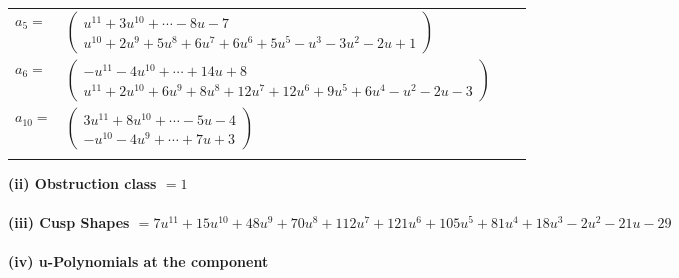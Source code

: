 \documentclass[1p]{elsarticle_modified}
\theoremstyle{definition}
\begin{document}
\begin{tabular}{m{7pt} m{180pt} m{7pt} m{180pt} }
\flushright $a_{5}=$&$\begin{pmatrix}u^{11}+3 u^{10}+\cdots-8 u-7\\u^{10}+2 u^9+5 u^8+6 u^7+6 u^6+5 u^5- u^3-3 u^2-2 u+1\end{pmatrix}$ \\
\flushright $a_{6}=$&$\begin{pmatrix}- u^{11}-4 u^{10}+\cdots+14 u+8\\u^{11}+2 u^{10}+6 u^9+8 u^8+12 u^7+12 u^6+9 u^5+6 u^4- u^2-2 u-3\end{pmatrix}$ \\
\flushright $a_{10}=$&$\begin{pmatrix}3 u^{11}+8 u^{10}+\cdots-5 u-4\\- u^{10}-4 u^9+\cdots+7 u+3\end{pmatrix}$\\&\end{tabular}
\flushleft \textbf{(ii) Obstruction class $= 1$}\\~\\
\flushleft \textbf{(iii) Cusp Shapes $= 7 u^{11}+15 u^{10}+48 u^9+70 u^8+112 u^7+121 u^6+105 u^5+81 u^4+18 u^3-2 u^2-21 u-29$}\\~\\
\newpage\renewcommand{\arraystretch}{1}
\flushleft \textbf{(iv) u-Polynomials at the component}\newline \\
\end{document}
